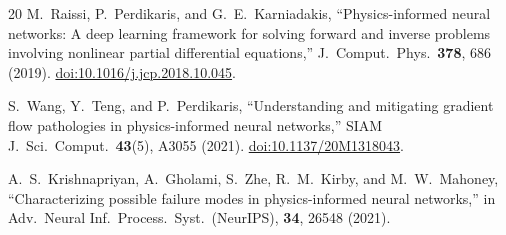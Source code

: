 \documentclass[a4paper,11pt]{article}
\begin{document}
\begin{thebibliography}{20}
M.~Raissi, P.~Perdikaris, and G.~E.~Karniadakis,
``Physics-informed neural networks: A deep learning framework for solving
forward and inverse problems involving nonlinear partial differential
equations,''
J.\ Comput.\ Phys.\ \textbf{378}, 686 (2019).
\href{https://doi.org/10.1016/j.jcp.2018.10.045}{doi:10.1016/j.jcp.2018.10.045}.

S.~Wang, Y.~Teng, and P.~Perdikaris,
``Understanding and mitigating gradient flow pathologies in
physics-informed neural networks,''
SIAM J.\ Sci.\ Comput.\ \textbf{43}(5), A3055 (2021).
\href{https://doi.org/10.1137/20M1318043}{doi:10.1137/20M1318043}.

A.~S.~Krishnapriyan, A.~Gholami, S.~Zhe, R.~M.~Kirby, and
M.~W.~Mahoney,
``Characterizing possible failure modes in physics-informed neural
networks,''
in Adv.\ Neural Inf.\ Process.\ Syst.\ (NeurIPS), \textbf{34}, 26548 (2021).

\end{thebibliography}
\end{document}
